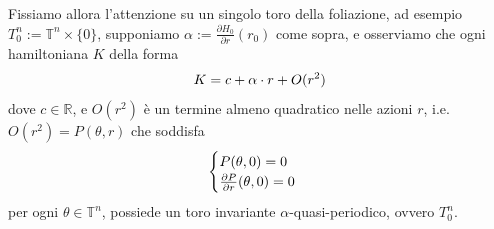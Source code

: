 \documentclass[twoside, 11pt]{amsbook}
\newcommand{\0}{{(0)}}
\newcommand{\3}{{(3)}}
\theoremstyle{colonplain}
\theoremstyle{colondefinition}
\theoremstyle{colonremark}
\numberwithin{equation}{chapter}
\begin{document}
Fissiamo allora l'attenzione su un singolo toro della foliazione, ad esempio $T^n_0 := \mathbb{T}^n \times \{0\}$, supponiamo $\alpha := \frac{\partial H_0}{\partial r}(r_0)$ come sopra, e osserviamo che ogni hamiltoniana $K$ della forma
\begin{align}
    K = c + \alpha \cdot r + O(r^2) \notag
\end{align}
dove $c \in \mathbb{R}$, e $O(r^2)$ è un termine almeno quadratico nelle azioni $r$, i.e. $O(r^2) = P(\theta, r)$ che soddisfa
\begin{align}
    \begin{cases}
        P(\theta, 0) = 0 \\
        \frac{\partial P}{\partial r}(\theta, 0) = 0
    \end{cases} \notag
\end{align}
per ogni $\theta \in \mathbb{T}^n$, possiede un toro invariante $\alpha$-quasi-periodico, ovvero $T^n_0$. \\ 
\end{document}
